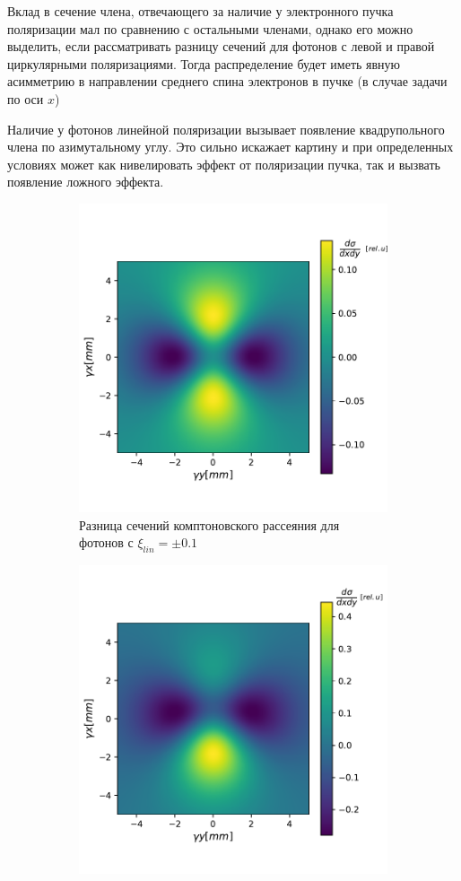 \documentclass[12pt]{article}
\begin{document}
Вклад в сечение члена, отвечающего за наличие у электронного пучка поляризации мал по сравнению с остальными членами, однако его можно выделить, если рассматривать разницу сечений для фотонов с левой и правой циркулярными поляризациями. Тогда распределение будет иметь явную асимметрию в направлении среднего спина электронов в пучке (в случае задачи по оси $x$)
\par Наличие у фотонов линейной поляризации вызывает появление квадрупольного члена по азимутальному углу. Это сильно искажает картину и при определенных условиях может как нивелировать эффект от поляризации пучка, так и вызвать появление ложного эффекта.
\begin{figure}[H]
	\begin{subfigure}{.5\textwidth}
		\centering
		\includegraphics[width=0.8\linewidth]{img/compton_dsdo_diff_q0p1}
		\caption{Разница сечений комптоновского рассеяния для фотонов с $\xi_{lin}=\pm0.1$}
		\label{fig:dsdxdy_dQ0.1}
	\end{subfigure}%
	\begin{subfigure}{.5\textwidth}
		\centering
		\includegraphics[width=0.8\linewidth]{img/compton_dsdo_diff_q0p1_v1}

\end{subfigure}
\end{figure}
\end{document}
